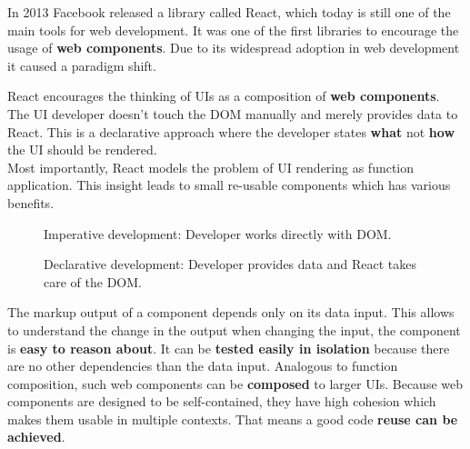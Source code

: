 In 2013 Facebook released a library called React, which today is still one of the main tools for web development. It was one of the first libraries to encourage the usage of \textbf{web components}. Due to its widespread adoption in web development it caused a paradigm shift.

React encourages the thinking of UIs as a composition of \textbf{web components}. The UI developer doesn't touch the DOM manually and merely provides data to React. This is a declarative approach where the developer states \textbf{what} not \textbf{how} the UI should be rendered. \\
Most importantly, React models the problem of UI rendering as function application. This insight leads to small re-usable components which has various benefits.

\begin{figure}[!htb]
  \caption{\label{fig:my-label} Imperative development: Developer works directly with DOM.}
\end{figure}

\begin{figure}[!htb]
  \caption{\label{fig:my-label} Declarative development: Developer provides data and React takes care of the DOM.}
\end{figure}

The markup output of a component depends only on its data input. This allows to understand the change in the output when changing the input, the component is \textbf{easy to reason about}. It can be \textbf{tested easily in isolation} because there are no other dependencies than the data input. Analogous to function composition, such web components can be \textbf{composed} to larger UIs. Because web components are designed to be self-contained, they have high cohesion which makes them usable in multiple contexts. That means a good code \textbf{reuse can be achieved}.

